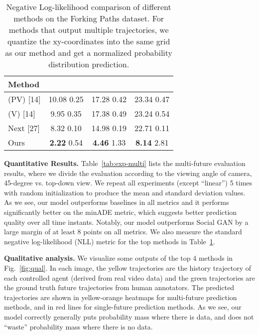 \documentclass[10pt,twocolumn,letterpaper]{article}
\begin{document}
\begin{table}[]
\centering
\begin{tabular}{l||c|c|c}
\hline
Method &    &  &   \\ \hline \hline
(PV) [14]    &  10.08 {\scriptsize0.25} & 17.28 {\scriptsize0.42} &23.34 {\scriptsize0.47}  \\ 
(V) [14]    &  9.95 {\scriptsize0.35} & 17.38 {\scriptsize0.49} &23.24 {\scriptsize0.54} \\ 
Next [27]  & 8.32 {\scriptsize0.10} & 14.98 {\scriptsize0.19} &22.71 {\scriptsize0.11} \\ 
 Ours & \textbf{2.22} {\scriptsize0.54} & \textbf{4.46} {\scriptsize1.33} & \textbf{8.14} {\scriptsize2.81} \\ \hline
\end{tabular}
\vspace{-3mm}
\caption{Negative Log-likelihood comparison of different methods on the Forking Paths dataset. For methods that output multiple trajectories, we quantize the xy-coordinates into the same grid as our method and get a normalized probability distribution prediction.} 
\vspace{-6mm}
\label{tab:exp-nll}
\end{table}

\noindent\textbf{Quantitative Results.} 
Table~\ref{tab:exp-multi} lists the multi-future evaluation results, where we divide the  evaluation according to the viewing angle of camera, 45-degree vs. top-down view. 
We repeat all experiments (except ``linear'') 5 times with random initialization to produce the mean and standard deviation values.
As we see, our model outperforms baselines in all metrics and it performs significantly better on the minADE metric, which suggests better prediction quality over all time instants.
Notably, our model outperforms Social GAN by a large margin of at least 8 points on all metrics.
We also measure the standard negative log-likelihood (NLL) metric for the top methods in Table~\ref{tab:exp-nll}.



\noindent\textbf{Qualitative analysis.} 
We visualize some outputs of the top 4 methods in Fig.~\ref{fig:qual}.
In each image, the yellow trajectories are the history trajectory of each controlled agent (derived from real 
video data)
and the green trajectories are the ground truth
 future trajectories from human annotators.
The predicted trajectories are shown in yellow-orange heatmaps for multi-future prediction methods, and in red lines for single-future prediction methods. 
As we see, our model correctly generally
puts probability
mass where there is data, and does not ``waste''
probability mass where there is no data.
\end{document}
